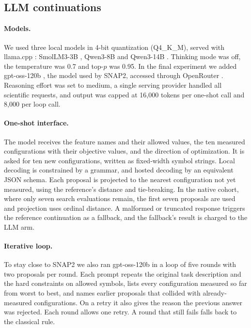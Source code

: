 \subsection{LLM continuations}

\paragraph{Models.} We used three local models in 4-bit quantization (Q4\_K\_M), served with llama.cpp \cite{gerganov2023llamacpp}: SmolLM3-3B \cite{huggingface2025smollm3}, Qwen3-8B and Qwen3-14B \cite{qwen2025qwen3}. Thinking mode was off, the temperature was 0.7 and top-$p$ was 0.95. In the final experiment we added gpt-oss-120b \cite{openai2025gptoss}, the model used by SNAP2, accessed through OpenRouter \cite{openrouter2025}. Reasoning effort was set to medium, a single serving provider handled all scientific requests, and output was capped at 16,000 tokens per one-shot call and 8,000 per loop call.

\paragraph{One-shot interface.} The model receives the feature names and their allowed values, the ten measured configurations with their objective values, and the direction of optimization. It is asked for ten new configurations, written as fixed-width symbol strings. Local decoding is constrained by a grammar, and hosted decoding by an equivalent JSON schema. Each proposal is projected to the nearest configuration not yet measured, using the reference's distance and tie-breaking. In the native cohort, where only seven search evaluations remain, the first seven proposals are used and projection uses ordinal distance. A malformed or truncated response triggers the reference continuation as a fallback, and the fallback's result is charged to the LLM arm.

\paragraph{Iterative loop.} To stay close to SNAP2 we also ran gpt-oss-120b in a loop of five rounds with two proposals per round. Each prompt repeats the original task description and the hard constraints on allowed symbols, lists every configuration measured so far from worst to best, and names earlier proposals that collided with already-measured configurations. On a retry it also gives the reason the previous answer was rejected. Each round allows one retry. A round that still fails falls back to the classical rule.

